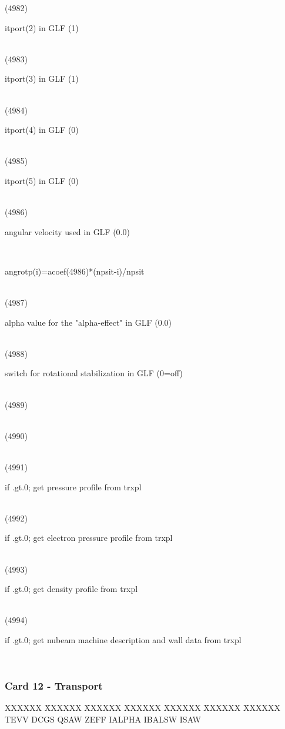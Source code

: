 \begin{tabbing}
(4982) \> \parbox[t]{\width}{itport(2) in GLF (1)} \\
(4983) \> \parbox[t]{\width}{itport(3) in GLF (1)} \\
(4984) \> \parbox[t]{\width}{itport(4) in GLF (0)} \\
(4985) \> \parbox[t]{\width}{itport(5) in GLF (0)} \\
(4986) \> \parbox[t]{\width}{angular velocity used in GLF (0.0)} \\
       \> \parbox[t]{\width}{angrotp(i)=acoef(4986)*(npsit-i)/npsit} \\
(4987) \> \parbox[t]{\width}{alpha value for the "alpha-effect" in GLF (0.0)} \\
(4988) \> \parbox[t]{\width}{switch for rotational stabilization in GLF (0=off)} \\
(4989) \> \parbox[t]{\width}{} \\
(4990) \> \parbox[t]{\width}{} \\
(4991) \> \parbox[t]{\width}{if .gt.0; get pressure profile from trxpl} \\
(4992) \> \parbox[t]{\width}{if .gt.0; get electron pressure profile from trxpl} \\
(4993) \> \parbox[t]{\width}{if .gt.0; get density profile from trxpl} \\
(4994) \> \parbox[t]{\width}{if .gt.0; get nubeam machine description and wall data from trxpl} \\
\end{tabbing}
\newpage \subsubsection{Card 12 - Transport} 
\begin{tabbing} 
XXXXXX \= XXXXXX \= XXXXXX \= XXXXXX \= XXXXXX \= XXXXXX \=
XXXXXX        \\ 
\footnotesize TEVV \>\footnotesize DCGS \>\footnotesize QSAW \>\footnotesize ZEFF
\>\footnotesize IALPHA \>\footnotesize IBALSW \>\footnotesize ISAW 
\end{tabbing} 

